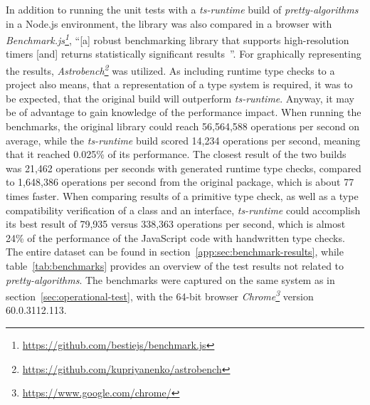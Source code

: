 In addition to running the unit tests with a \emph{ts-runtime} build of \emph{pretty-algorithms} in a Node.js environment, the library was also compared in a browser with \emph{Benchmark.js\footnote{\url{https://github.com/bestiejs/benchmark.js}}}, ``[a] robust benchmarking library that supports high-resolution timers [and] returns statistically significant results~\cite{Evaluation:benchmarkjs}''. For graphically representing the results, \emph{Astrobench\footnote{\url{https://github.com/kupriyanenko/astrobench}}} was utilized. As including runtime type checks to a project also means, that a representation of a type system is required, it was to be expected, that the original build will outperform \emph{ts-runtime}. Anyway, it may be of advantage to gain knowledge of the performance impact. When running the benchmarks, the original library could reach 56,564,588 operations per second on average, while the \emph{ts-runtime} build scored 14,234 operations per second, meaning that it reached 0.025\% of its performance. The closest result of the two builds was 21,462 operations per seconds with generated runtime type checks, compared to 1,648,386 operations per second from the original package, which is about 77 times faster. When comparing results of a primitive type check, as well as a type compatibility verification of a class and an interface, \emph{ts-runtime} could accomplish its best result of 79,935 versus 338,363 operations per second, which is almost 24\% of the performance of the JavaScript code with handwritten type checks. The entire dataset can be found in section~\ref{app:sec:benchmark-results}, while table~\ref{tab:benchmarks} provides an overview of the test results not related to \emph{pretty-algorithms}. The benchmarks were captured on the same system as in section~\ref{sec:operational-test}, with the 64-bit browser \emph{Chrome\footnote{\url{https://www.google.com/chrome/}}} version 60.0.3112.113.
